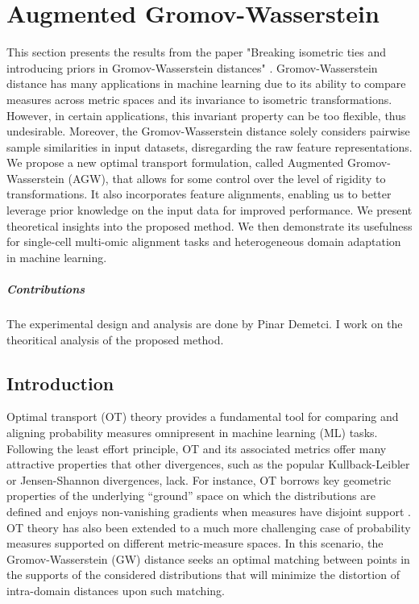 
\chapter[Augmented Gromov-Wasserstein]{Augmented Gromov-Wasserstein}

\localtableofcontents*


\hfill \break
This section presents the results from the paper "Breaking isometric ties and introducing priors
in Gromov-Wasserstein distances" \citep{Demetci23}.
Gromov-Wasserstein distance has many applications in machine learning due to its ability
to compare measures across metric spaces and its invariance to isometric transformations. However,
in certain applications, this invariant property can be too flexible, thus undesirable. Moreover,
the Gromov-Wasserstein distance solely considers pairwise sample similarities in input datasets,
disregarding the raw feature representations. We propose a new optimal transport formulation,
called Augmented Gromov-Wasserstein (AGW), that allows for some control over the
level of rigidity to transformations. It also incorporates feature alignments,
enabling us to better leverage prior knowledge on the input data for improved performance.
We present theoretical insights into the proposed method. We then demonstrate its usefulness
for single-cell multi-omic alignment tasks and heterogeneous domain adaptation in machine learning.

\paragraph{Contributions} The experimental design and analysis are done by Pinar Demetci.
I work on the theoritical analysis of the proposed method.

\section{Introduction}

Optimal transport (OT) theory provides a fundamental tool for comparing and
aligning probability measures omnipresent in machine learning (ML) tasks.
Following the least effort principle, OT and its associated metrics offer
many attractive properties that other divergences, such as the popular Kullback-Leibler or
Jensen-Shannon divergences, lack. For instance, OT borrows key geometric properties of
the underlying ``ground'' space on which the distributions are defined \citep{Villani03}
and enjoys non-vanishing gradients when measures have disjoint support \citep{Arjovsky17}.
OT theory has also been extended to a much more challenging case of probability measures supported
on different metric-measure spaces. In this scenario, the Gromov-Wasserstein (GW) distance
seeks an optimal matching between points in the supports of the considered distributions
that will minimize the distortion of intra-domain distances upon such matching.

